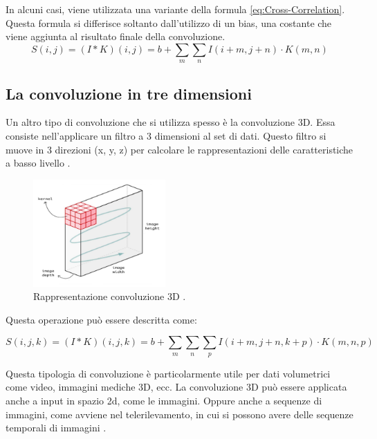 In alcuni casi, viene utilizzata una variante della formula \eqref{eq:Cross-Correlation}. Questa
formula si differisce soltanto dall'utilizzo di un bias, una costante che viene aggiunta al risultato 
finale della convoluzione. 
\begin{equation}
    S(i,j)=(I*K)(i,j)= b + \sum_m \sum_n I(i+m,j+n)\cdot K(m,n)
    \label{eq:Cross-Correlation_bias}
\end{equation}

\subsection{La convoluzione in tre dimensioni}
Un altro tipo di convoluzione che si utilizza spesso è la convoluzione 3D. 
Essa consiste nell'applicare un filtro a 3 dimensioni al set di dati.
Questo filtro si muove in 3 direzioni (x, y, z) per calcolare le 
rappresentazioni delle caratteristiche a basso livello \cite{ASPETTI_CONVOLUZIONE_1}.

\begin{figure}[H]
    \centering
    \includegraphics[width=0.45\textwidth]{Immagini/Generiche/3D_conv_moving.png}
    \caption{Rappresentazione convoluzione 3D \cite{MOVING_3D_Kernel}.}
    \label{fig:convoluzioneRGB}
\end{figure} 

Questa operazione può essere descritta come:

\begin{equation}
    S(i,j, k)=(I*K)(i,j,k)= b + \sum_m \sum_n \sum_p I(i+m,j+n, k+p)\cdot K(m, n, p)
    \label{eq:3D_conv_form}
\end{equation}

Questa tipologia di convoluzione è particolarmente utile per dati volumetrici 
come video, immagini mediche 3D, ecc.  La convoluzione 3D può essere applicata 
anche a input in spazio 2d, come le immagini. Oppure anche a sequenze di immagini,
come avviene nel telerilevamento, in cui si possono avere delle sequenze temporali 
di immagini \cite{ASPETTI_CONVOLUZIONE_1,MOVING_3D_Kernel}.

